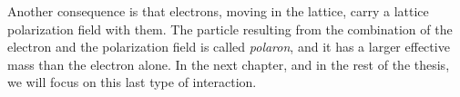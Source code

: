 Another consequence is that electrons, moving in the lattice, carry a lattice polarization field with them. The particle resulting from the combination of the electron and the polarization field is called \emph{polaron}, and it has a larger effective mass than the electron alone. In the next chapter, and in the rest of the thesis, we will focus on this last type of interaction.